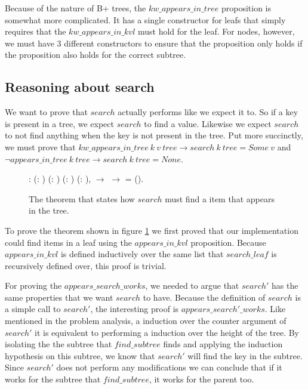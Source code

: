 Because of the nature of B+ trees, the $kw\_appears\_in\_tree$ proposition is somewhat more complicated. It has a single constructor for leafs that simply requires that the $kw\_appears\_in\_kvl$ must hold for the leaf. For nodes, however, we must have 3 different constructors to ensure that the proposition only holds if the proposition also holds for the correct subtree.

\subsection{Reasoning about search}
We want to prove that $search$ actually performs like we expect it to. So if a key is present in a tree, we expect $search$ to find a value. Likewise we expect $search$ to not find anything when the key is not present in the tree.
Put more succinctly, we must prove that $kw\_appears\_in\_tree~k~v~tree \rightarrow search~k~tree = Some~v$ and $\lnot appears\_in\_tree~k~tree \rightarrow search~k~tree = None$.

\begin{figure}
  \begin{coqdoccode}
  \coqdocnoindent
    : \coqdockw{\ensuremath{\forall}} (: ) (: ) (:   ) (: ),\coqdoceol
  \coqdocindent{1.00em}
      \ensuremath{\rightarrow} \coqdoceol
  \coqdocindent{1.00em}
      \ensuremath{\rightarrow} \coqdoceol
  \coqdocindent{1.00em}
    = ().\coqdoceol
  \end{coqdoccode}
  \caption{The theorem that states how $search$ must find a item that appears in the tree.}
  \label{fig:search_works}
\end{figure}

To prove the theorem shown in figure \ref{fig:search_works} we first proved that our implementation could find items in a leaf using the $appears\_in\_kvl$ proposition. Because $appears\_in\_kvl$ is defined inductively over the same list that $search\_leaf$ is recursively defined over, this proof is trivial.

For proving the $appears\_search\_works$, we needed to argue that $search'$ has the same properties that we want $search$ to have. Because the definition of $search$ is a simple call to $search'$, the interesting proof is $appears\_search'\_works$. Like mentioned in the problem analysis, a induction over the counter argument of $search'$ it is equivalent to performing a induction over the height of the tree. By isolating the the subtree that $find\_subtree$ finds and applying the induction hypothesis on this subtree, we know that $search'$ will find the key in the subtree. Since $search'$ does not perform any modifications we can conclude that if it works for the subtree that $find\_subtree$, it works for the parent too. 

